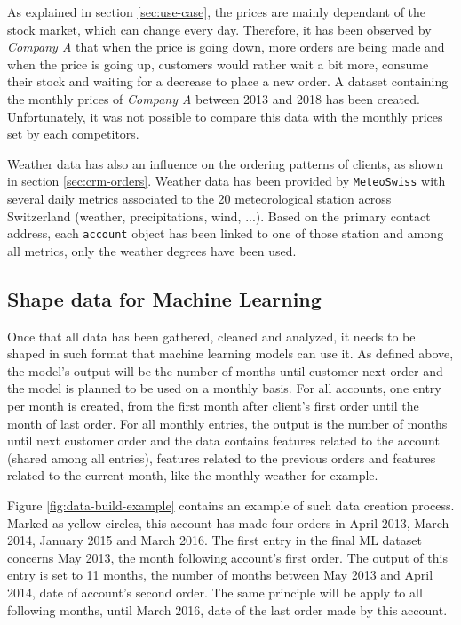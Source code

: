 As explained in section \ref{sec:use-case}, the prices are mainly dependant of the stock market, which can change every day. Therefore, it has been observed by \textit{Company A} that when the price is going down, more orders are being made and when the price is going up, customers would rather wait a bit more, consume their stock and waiting for a decrease to place a new order. A dataset containing the monthly prices of \textit{Company A} between 2013 and 2018 has been created. Unfortunately, it was not possible to compare this data with the monthly prices set by each competitors.

Weather data has also an influence on the ordering patterns of clients, as shown in section \ref{sec:crm-orders}. Weather data has been provided by \texttt{MeteoSwiss} with several daily metrics associated to the 20 meteorological station across Switzerland (weather, precipitations, wind, ...). Based on the primary contact address, each \texttt{account} object has been linked to one of those station and among all metrics, only the weather degrees \big[°C\big] have been used.


\subsection{Shape data for Machine Learning }\label{sec:data-shape-for-ml}
Once that all data has been gathered, cleaned and analyzed, it needs to be shaped in such format that machine learning models can use it. As defined above, the model's output will be the number of months until customer next order and the model is planned to be used on a monthly basis. For all accounts, one entry per month is created, from the first month after client's first order until the month of last order. For all monthly entries, the output is the number of months until next customer order and the data contains features related to the account (shared among all entries), features related to the previous orders and features related to the current month, like the monthly weather for example. 

Figure \ref{fig:data-build-example} contains an example of such data creation process. Marked as yellow circles, this account has made four orders in April 2013, March 2014, January 2015 and March 2016. The first entry in the final ML dataset concerns May 2013, the month following account's first order. The output of this entry is set to 11 months, the number of months between May 2013 and April 2014, date of account's second order. The same principle will be apply to all following months, until March 2016, date of the last order made by this account.

